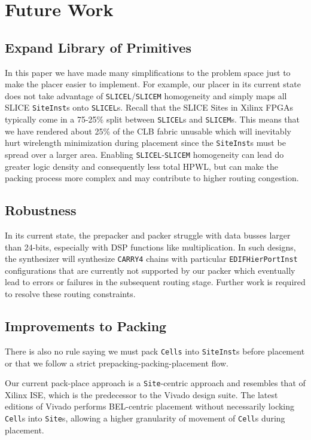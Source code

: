 \section{Future Work}

\subsection{Expand Library of Primitives}
In this paper we have made many simplifications to the problem space just to make the placer easier to implement.
For example, our placer in its current state does not take advantage of \texttt{SLICEL}/\texttt{SLICEM} homogeneity and simply maps all SLICE \texttt{SiteInst}s onto \texttt{SLICEL}s. 
Recall that the SLICE Sites in Xilinx FPGAs typically come in a 75-25\% split between \texttt{SLICEL}s and \texttt{SLICEM}s. 
This means that we have rendered about 25\% of the CLB fabric unusable which will inevitably hurt wirelength minimization during placement since the \texttt{SiteInst}s must be spread over a larger area. 
Enabling \texttt{SLICEL}-\texttt{SLICEM} homogeneity can lead do greater logic density and consequently less total HPWL, but can make the packing process more complex and may contribute to higher routing congestion.

\subsection{Robustness}
In its current state, the prepacker and packer struggle with data busses larger than 24-bits, especially with DSP functions like multiplication. 
In such designs, the synthesizer will synthesize \texttt{CARRY4} chains with particular \texttt{EDIFHierPortInst} configurations that are currently not supported by our packer which eventually lead to errors or failures in the subsequent routing stage.
Further work is required to resolve these routing constraints.

\subsection{Improvements to Packing}
There is also no rule saying we must pack \texttt{Cells} into \texttt{SiteInst}s before placement or that we follow a strict prepacking-packing-placement flow. 

Our current pack-place approach is a \texttt{Site}-centric approach and resembles that of Xilinx ISE, which is the predecessor to the Vivado design suite.
The latest editions of Vivado performs BEL-centric placement without necessarily locking \texttt{Cell}s into \texttt{Site}s, allowing a higher granularity of movement of \texttt{Cell}s during placement. 

